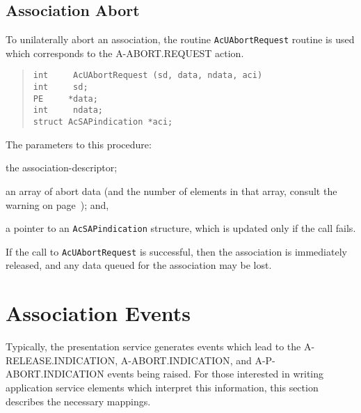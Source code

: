 \subsection	{Association Abort}
To unilaterally abort an association,
the routine \verb"AcUAbortRequest" routine is used
which corresponds to the {\sf A-ABORT.REQUEST\/} action.
\begin{quote}\small\begin{verbatim}
int     AcUAbortRequest (sd, data, ndata, aci)
int     sd;
PE     *data;
int     ndata;
struct AcSAPindication *aci;
\end{verbatim}\end{quote}
The parameters to this procedure:
\begin{describe}
\item[\verb"sd":] the association-descriptor;

\item[\verb"data"/\verb"ndata":] an array of abort data
(and the number of elements in that array,
consult the warning on page~\pageref{AcSAPdata});
and,

\item[\verb"aci":] a pointer to an \verb"AcSAPindication" structure,
which is updated only if the call fails.
\end{describe}
If the call to \verb"AcUAbortRequest" is successful,
then the association is immediately released,
and any data queued for the association may be lost.

\section	{Association Events}
Typically,
the presentation service generates events which lead to the
{\sf A-RELEASE.INDICATION}, {\sf A-ABORT.INDICATION},
and {\sf A-P-ABORT.IN\-DI\-CA\-TION\/} events being raised.
For those interested in writing application service elements which interpret
this information,
this section describes the necessary mappings.


